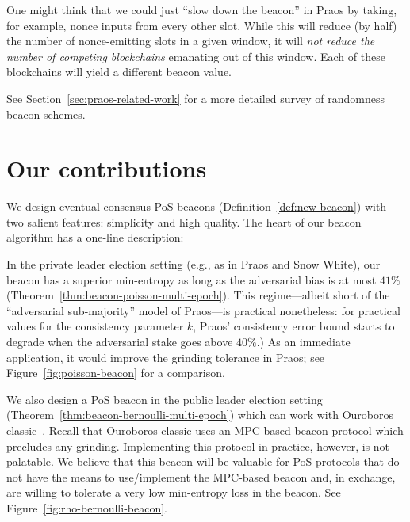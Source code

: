     One might think that we could just ``slow down the beacon'' in Praos 
    by taking, for example, nonce inputs from every other slot. 
    While this will reduce (by half) the number of nonce-emitting slots in a given window, 
    it will \emph{not reduce the number of competing blockchains} emanating out of this window. 
    Each of these blockchains will yield a different beacon value. 


    See Section~\ref{sec:praos-related-work} for 
    a more detailed survey of randomness beacon schemes.



\section{Our contributions}
    We design eventual consensus PoS beacons 
    (Definition~\ref{def:new-beacon}) 
    with two salient features: simplicity and high quality. 
    The heart of our beacon algorithm has a one-line description: 


    In the private leader election setting (e.g., as in Praos and Snow White), 
    our beacon has a superior min-entropy 
    as long as the adversarial bias is at most $41\%$ (Theorem~\ref{thm:beacon-poisson-multi-epoch}). 
    This regime---albeit short of the ``adversarial sub-majority'' model of Praos---is practical nonetheless: 
    for practical values for the consistency parameter $k$, 
    Praos' consistency error bound 
    starts to degrade when the adversarial stake goes above $40\%$.) 
    As an immediate application, it would improve the grinding tolerance in Praos; 
    see Figure~\ref{fig:poisson-beacon} for a comparison.


    We also design a PoS beacon in the public leader election setting (Theorem~\ref{thm:beacon-bernoulli-multi-epoch})
    which can work with Ouroboros classic~\cite{Ouroboros}. 
    Recall that Ouroboros classic uses an MPC-based beacon protocol 
    which precludes any grinding. 
    Implementing this protocol in practice, however, is not palatable. 
    We believe that this beacon will be valuable for 
    PoS protocols 
    that do not have the means to use/implement the MPC-based beacon 
    and, in exchange, are willing to tolerate a very low min-entropy loss 
    in the beacon. 
    See Figure~\ref{fig:rho-bernoulli-beacon}.


